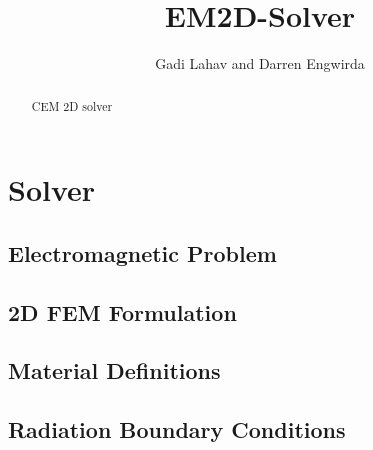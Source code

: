 \documentclass[twoside,a4paper]{refart}
\title{EM2D-Solver}
\author{Gadi Lahav and Darren Engwirda}
\date{}
\begin{document}
\maketitle

\begin{abstract}
	CEM 2D solver
\end{abstract}



\tableofcontents

\newpage




\section{Solver}
\label{sec:Solver}



\subsection{Electromagnetic Problem}
\label{subsec:EM problem}


\subsection{2D FEM Formulation}
\label{subsec:FEM formulation}


\subsection{Material Definitions}
\label{subsec:Material Definitions}


\subsection{Radiation Boundary Conditions}
\label{subsec:Radiation BCs}



\printindex
\end{document}
